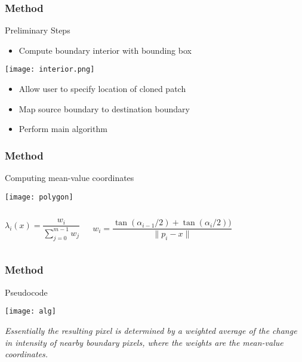 \documentclass{beamer}
\theoremstyle{remark}
\begin{document}
\begin{frame}[t]
 \frametitle{Method}
 
\begin{block}{Preliminary Steps}
\begin{itemize}
\pause 
\item Compute boundary interior with bounding box
\end{itemize}
\pause
\begin{center}
 \texttt{[image: interior.png]}
\end{center}
\pause
\begin{itemize}
 \item Allow user to specify location of cloned patch
 \pause
 \item Map source boundary to destination boundary
 \pause
 \item Perform main algorithm
\end{itemize}
\end{block}
\end{frame}

\begin{frame}[t]
 \frametitle{Method}
 
\begin{block}{Computing mean-value coordinates}
  \begin{center}
\texttt{[image: polygon]}
\end{center}
\pause
\vspace{2mm}
\begin{columns}
 \[
 \lambda_i(x)=\frac{w_i}{\sum_{j=0}^{m-1}w_j}
 \]
 
  \vspace{-4mm}
  \[
  w_i=\frac{\tan(\alpha_{i-1}/2)+\tan(\alpha_i/2))}{\|p_i-x\|}
  \]
\end{columns}
\end{block}
\end{frame}






\begin{frame}[t]
 \frametitle{Method}
 
\begin{block}{Pseudocode}
\vspace{-2mm}
 \begin{center}
\texttt{[image: alg]}
\end{center}
\end{block}
\pause
\vspace{-5mm}
\emph{Essentially the resulting pixel is determined by a weighted average of the \alert{change in intensity of nearby boundary pixels}, where the weights are the mean-value coordinates.}
\end{frame}
\end{document}
